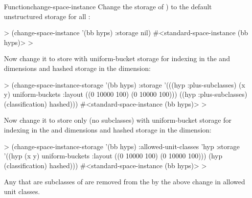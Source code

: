 \documentclass[10pt,twoside,english,pdftex]{article}
\begin{document}
\begin{functiondoc}{Function}{change-space-instance}{%
     
    \returns{} }
\fnexamples
%
Change the storage of  ) to the default
unstructured storage for all :
%
\W\supp
\begin{example}
> (change-space-instance '(bb hyps) :storage nil)
#<standard-space-instance (bb hyps)>
>
\end{example}
%
Now change it to store   with uniform-bucket
storage for indexing in the  and  dimensions and hashed
storage in the  dimension:
%
\W\supp\notpretop
\begin{example}
> (change-space-instance-storage '(bb hyps)
     :storage '(((hyp :plus-subclasses) (x y) 
                  uniform-buckets :layout ((0 10000 100)
                                           (0 10000 100)))
                ((hyp :plus-subclasses) (classification) 
                  hashed)))
#<standard-space-instance (bb hyps)>
>
\end{example}
%
Now change it to store only   (no subclasses)
with uniform-bucket storage for indexing in the  and 
dimensions and hashed storage in the  dimension:
%
\W\supp\notpretop
\begin{example}
> (change-space-instance-storage '(bb hyps)
     :allowed-unit-classes 'hyp     
     :storage '((hyp (x y) 
                 uniform-buckets :layout ((0 10000 100)
                                          (0 10000 100)))
                (hyp (classification) hashed)))
#<standard-space-instance (bb hyps)>
> 
\end{example}
%
Any  that are subclasses of  are removed from
the   by the above change in allowed
unit classes.

\end{functiondoc}

\end{document}

